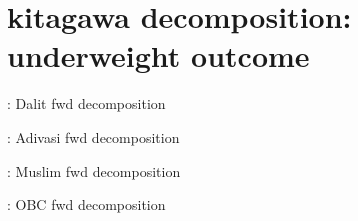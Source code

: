 \documentclass{article}
\begin{document}
\newpage
\section{kitagawa decomposition: underweight outcome}


\begin{table}[H]
    \centering
    \footnotesize %
    \caption{: Dalit fwd decomposition}
    \label{tab:sumstat}
\end{table}

\begin{table}[H]
    \centering
    \footnotesize %
    \caption{: Adivasi fwd decomposition}
    \label{tab:sumstat}
\end{table}



\begin{table}[H]
    \centering
    \footnotesize %
    \caption{: Muslim fwd decomposition}
    \label{tab:sumstat}
\end{table}

\begin{table}[H]
    \centering
    \footnotesize %
    \caption{: OBC fwd decomposition}
    \label{tab:sumstat}
\end{table}








\end{document}
